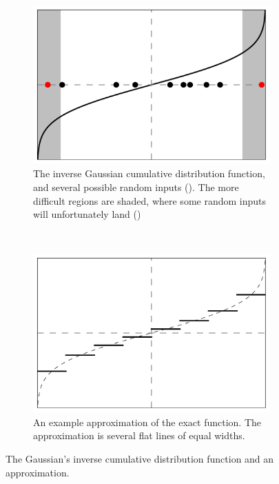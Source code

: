 \documentclass[11pt,a4paper,oneside,english]{extarticle}
\begin{document}
\begin{figure}[htb]
\centering
\begin{subfigure}[t]{0.45\linewidth}
\centering
\includegraphics[width=\linewidth]{inverse_cdf_function_tails_simplified}
\begin{minipage}[t]{0.9\linewidth}
\caption{The inverse Gaussian cumulative distribution function, and several possible random inputs (\CIRCLE). The more difficult regions are shaded, where some random inputs will unfortunately land ({\color{red}\CIRCLE})}
\label{fig:inverse_cdf_function_tails_simplified}
\end{minipage}
\end{subfigure}%
~
\begin{subfigure}[t]{0.45\linewidth}
\centering
\includegraphics[width=\linewidth]{inverse_cdf_uniform_discretisation_unshaded_simplified}
\begin{minipage}[t]{0.9\linewidth}
\caption{An example approximation of the exact function. The approximation is several flat lines of equal widths.}
\label{fig:inverse_cdf_uniform_discretisation_unshaded_simplified}
\end{minipage}
\end{subfigure}
\caption{The Gaussian's inverse cumulative distribution function and an approximation.}
\label{fig:gaussian_inverse_cdf}
\end{figure}
\end{document}
